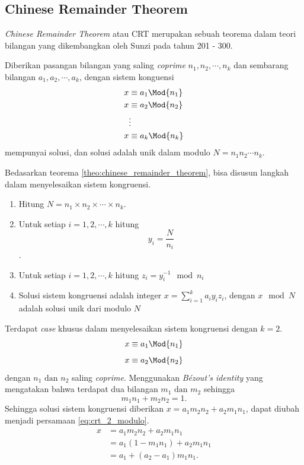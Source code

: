 \subsection{Chinese Remainder Theorem}
\textit{Chinese Remainder Theorem} atau CRT merupakan sebuah teorema dalam teori bilangan yang dikembangkan oleh Sunzi pada tahun 201 - 300.
\begin{theo}
	\label{theo:chinese_remainder_theorem}
	Diberikan pasangan bilangan yang saling \textit{coprime} $n_1, n_2, \cdots, n_k$ dan sembarang bilangan $ a_1, a_2, \cdots, a_k $, dengan sistem konguensi 
	\begin{equation}
		\begin{aligned}
		x &\equiv a_1 \Mod{n_1}\\
		x &\equiv a_2 \Mod{n_2}\\
		& \vdots\\
		x &\equiv a_k \Mod{n_k}\\
		\end{aligned}
	\end{equation}
	mempunyai solusi, dan solusi adalah unik dalam modulo $ N = n_1n_2\cdots n_k$.
\end{theo}
Bedasarkan teorema \ref{theo:chinese_remainder_theorem}, bisa disusun langkah dalam menyelesaikan sistem kongruensi\cite{brilliant_crt}. 
\begin{enumerate}
	\item Hitung $ N = n_1 \times n_2 \times \cdots \times n_k$.
	\item Untuk setiap $ i = 1,2,\cdots,k $ hitung $$ y_i = \frac{N}{n_i} $$.
	\item Untuk setiap $ i = 1,2,\cdots,k $ hitung $ z_i = y_i^{-1} \mod{n_i} $
	\item Solusi sistem kongruensi adalah integer $ x = \sum_{i=1}^{k} a_i y_i z_i $, dengan $ x \mod{N} $ adalah solusi unik dari modulo $ N $
\end{enumerate}
Terdapat \textit{case} khusus dalam menyelesaikan sistem kongruensi dengan $ k = 2 $.
$$ x \equiv a_1 \Mod{n_1} $$
$$ x \equiv a_2 \Mod{n_2} $$
dengan $ n_1 \text{ dan } n_2 $ saling \textit{coprime}.
Menggunakan \textit{Bézout's identity} yang mengatakan bahwa terdapat dua bilangan $ m_1 \text{ dan } m_2 $ sehingga 
\begin{equation}
	m_1 n_1 + m_2 n_2 = 1.
	\label{eq:bezeout_identity}
\end{equation}
Sehingga solusi sistem kongruensi diberikan $ x = a_1 m_2 n_2 + a_2 m_1 n_1 $, dapat diubah menjadi persamaan \eqref{eq:crt_2_modulo}.
\begin{equation}
	\begin{aligned}
		x &= a_1 m_2 n_2 +a_2 m_1n_1 \\
		  &= a_1 (1-m_1 n_1) + a_2 m_1 n_1 \\
		  &= a_1 +( a_2-a_1) m_1 n_1.
	\end{aligned}
	\label{eq:crt_2_modulo}
\end{equation}

